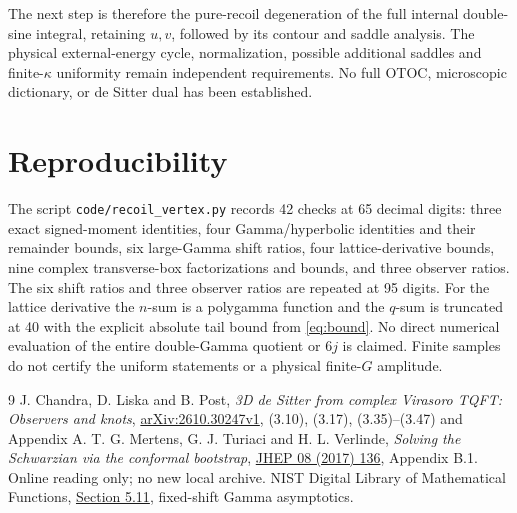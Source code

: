 \documentclass[11pt,a4paper]{article}
\begin{document}
The next step is therefore the pure-recoil degeneration of the full
internal double-sine integral, retaining \(u,v\), followed by its
contour and saddle analysis. The physical external-energy cycle,
normalization, possible additional saddles and finite-\(\kappa\)
uniformity remain independent requirements. No full OTOC, microscopic
dictionary, or de Sitter dual has been established.

\section{Reproducibility}
The script \texttt{code/recoil\_vertex.py} records 42 checks at 65
decimal digits: three exact signed-moment identities, four
Gamma/hyperbolic identities and their remainder bounds, six
large-Gamma shift ratios, four lattice-derivative bounds, nine
complex transverse-box factorizations and bounds, and three observer
ratios. The six shift ratios and three observer ratios are repeated
at 95 digits. For the lattice derivative the \(n\)-sum is a polygamma
function and the \(q\)-sum is truncated at 40 with the explicit
absolute tail bound from \eqref{eq:bound}. No direct numerical
evaluation of the entire double-Gamma quotient or \(6j\) is claimed.
Finite samples do not certify the uniform statements or a physical
finite-\(G\) amplitude.

\begin{thebibliography}{9}
 J. Chandra, D. Liska and B. Post,
\emph{3D de Sitter from complex Virasoro TQFT: Observers and knots},
\href{https://arxiv.org/html/2610.30247v1}{arXiv:2610.30247v1},
(3.10), (3.17), (3.35)--(3.47) and Appendix A.
 T. G. Mertens, G. J. Turiaci and H. L. Verlinde,
\emph{Solving the Schwarzian via the conformal bootstrap},
\href{https://doi.org/10.1007/JHEP08(2017)136}{JHEP 08 (2017) 136},
Appendix B.1. Online reading only; no new local archive.
 NIST Digital Library of Mathematical Functions,
\href{https://dlmf.nist.gov/5.11}{Section 5.11},
fixed-shift Gamma asymptotics.
\end{thebibliography}
\end{document}
